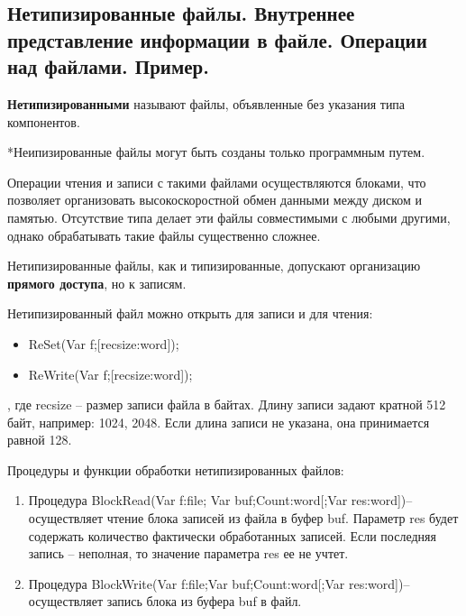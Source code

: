 
\newpage\subsection{Нетипизированные  файлы.  Внутреннее  представление  информации  в  файле.  Операции 
над файлами. Пример. }

\begin{myquote}
            
\end{myquote}

{\bf{Нетипизированными}} называют файлы, объявленные без указания типа компонентов.

*Неипизированные файлы могут быть созданы только программным путем.

Операции чтения и записи с такими файлами осуществляются блоками, что позволяет организовать высокоскоростной обмен данными между диском и памятью. Отсутствие типа делает эти файлы совместимыми с любыми другими, однако обрабатывать такие файлы существенно сложнее.

Нетипизированные файлы, как и типизированные, допускают организацию {\bf{прямого доступа}}, но к записям.

Нетипизированный файл можно открыть для записи и для чтения:
\begin{itemize}
         \item ReSet(Var f;[recsize:word]);
         \item ReWrite(Var f;[recsize:word]);
\end{itemize}

, где recsize – размер записи файла в байтах. Длину записи задают кратной 512 байт, например:  1024, 2048. Если длина записи не указана, она принимается равной 128.

Процедуры и функции обработки нетипизированных файлов:
\begin{enumerate}
    \item Процедура BlockRead(Var f:file; Var buf;Count:word[;Var res:word])– осуществляет чтение блока записей из файла в буфер buf. 
Параметр res будет содержать количество фактически обработанных записей. Если последняя запись – неполная, то значение параметра res ее не учтет. 
    \item Процедура BlockWrite(Var f:file;Var buf;Count:word[;Var res:word])– осуществляет запись блока из буфера buf в файл.
\end{enumerate}


